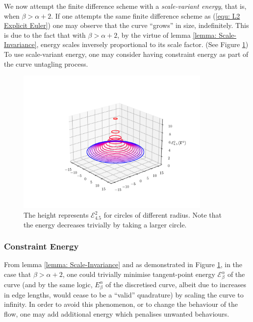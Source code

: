 \documentclass[../dissertation.tex]{subfiles}
\begin{document}
We now attempt the finite difference scheme with a \textit{scale-variant energy}, that is, when $\beta > \alpha + 2$. 
If one attempts the same finite difference scheme as (\ref{equ: L2 Explicit Euler})
one may observe that the curve ``grows'' in size, indefinitely.
This is due to the fact that with $\beta > \alpha + 2$,
by the virtue of lemma \ref{lemma: Scale-Invariance},
energy scales inversely proportional to its scale factor.
(See Figure \ref{fig: Scale Variant})
To use scale-variant energy, one may consider having constraint energy as part of the curve untagling process.
\begin{figure}[tbp]
    \centering
    \includegraphics[width=0.85\textwidth]{sections/unknottingCurveImgs/scaleVariant}
    \caption{The height represents $\mathcal{E}_{4.5}^{2}$ for circles of different radius. Note that the energy decreases trivially by taking a larger circle.}
    \label{fig: Scale Variant}
\end{figure}
\subsubsection{Constraint Energy}
\label{sct: Constraint Energy}
From lemma \ref{lemma: Scale-Invariance} and as demonstrated in Figure \ref{fig: Scale Variant}, in the case that $\beta > \alpha + 2$,
one could trivially minimise tangent-point energy $\mathcal{E}_{\beta}^{\alpha}$ of the curve 
(and by the same logic, $E_{\beta}^{\alpha}$ of the discretised curve, albeit due to increases in edge lengths, would cease to be a ``valid'' quadrature)
by scaling the curve to infinity.
In order to avoid this phenomenon, or to change the behaviour of the flow, one may add additional energy which penalises unwanted behaviours.
\end{document}
